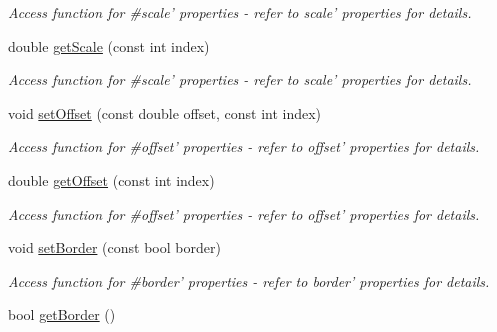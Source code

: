 \begin{DoxyCompactItemize}
\begin{DoxyCompactList}\small\item\em Access function for \#scale' properties -\/ refer to scale' properties for details. \end{DoxyCompactList}\item 
\hypertarget{classQEShape_a8ac75f2b40fd1edd5ec29e897e10333f}{
double \hyperlink{classQEShape_a8ac75f2b40fd1edd5ec29e897e10333f}{getScale} (const int index)}
\label{classQEShape_a8ac75f2b40fd1edd5ec29e897e10333f}

\begin{DoxyCompactList}\small\item\em Access function for \#scale' properties -\/ refer to scale' properties for details. \end{DoxyCompactList}\item 
\hypertarget{classQEShape_a6e3f1b0f5220ac417eeda4d7030cd954}{
void \hyperlink{classQEShape_a6e3f1b0f5220ac417eeda4d7030cd954}{setOffset} (const double offset, const int index)}
\label{classQEShape_a6e3f1b0f5220ac417eeda4d7030cd954}

\begin{DoxyCompactList}\small\item\em Access function for \#offset' properties -\/ refer to offset' properties for details. \end{DoxyCompactList}\item 
\hypertarget{classQEShape_a622b7759b5c356b8672353921b20a575}{
double \hyperlink{classQEShape_a622b7759b5c356b8672353921b20a575}{getOffset} (const int index)}
\label{classQEShape_a622b7759b5c356b8672353921b20a575}

\begin{DoxyCompactList}\small\item\em Access function for \#offset' properties -\/ refer to offset' properties for details. \end{DoxyCompactList}\item 
\hypertarget{classQEShape_aab613462c551887e2f3fe99777f72fb6}{
void \hyperlink{classQEShape_aab613462c551887e2f3fe99777f72fb6}{setBorder} (const bool border)}
\label{classQEShape_aab613462c551887e2f3fe99777f72fb6}

\begin{DoxyCompactList}\small\item\em Access function for \#border' properties -\/ refer to border' properties for details. \end{DoxyCompactList}\item 
\hypertarget{classQEShape_a429b63f0d85df06fac38a287c2037ac5}{
bool \hyperlink{classQEShape_a429b63f0d85df06fac38a287c2037ac5}{getBorder} ()}
\label{classQEShape_a429b63f0d85df06fac38a287c2037ac5}


\end{DoxyCompactItemize}
